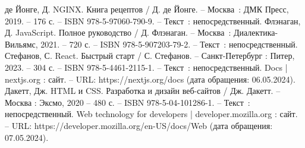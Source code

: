 \begin{thebibliography}{9}
	 де Йонге, Д. NGINX. Книга рецептов / Д. де Йонге. – Москва~: ДМК Пресс, 2019. – 176 с. – ISBN 978-5-97060-790-9. – Текст~: непосредственный.
	 Флэнаган, Д. JavaScript. Полное руководство / Д. Флэнаган. – Москва~: Диалектика-Вильямс, 2021. – 720 с. – ISBN 978-5-907203-79-2. – Текст~: непосредственный.
	 Стефанов, С. React. Быстрый старт / С. Стефанов. – Санкт-Петербург : Питер, 2023. – 304 с. – ISBN 978-5-4461-2115-1. – Текст~: непосредственный.
	 Docs | nextjs.org : сайт. – URL: https://nextjs.org/docs (дата обращения: 06.05.2024).
	 Дакетт, Дж. HTML и CSS. Разработка и дизайн веб-сайтов / Дж. Дакетт. – Москва : Эксмо, 2020 – 480 с. – ISBN 978-5-04-101286-1. – Текст~: непосредственный.
	 Web technology for developers | developer.mozilla.org : сайт. – URL: https://developer.mozilla.org/en-US/docs/Web (дата обращения: 07.05.2024).
\end{thebibliography}